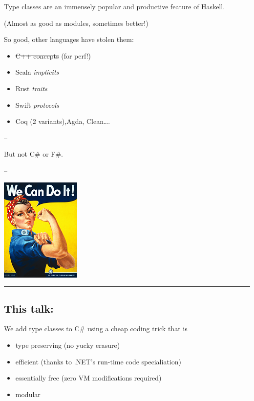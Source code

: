 Type classes are an immensely popular and productive feature of Haskell.

(Almost as good as modules, sometimes better!)

So good, other languages have stolen them:

\begin{itemize}
\tightlist
\item
  \sout{C++ concepts} (for perf!)
\item
  Scala \emph{implicits}
\item
  Rust \emph{traits}
\item
  Swift \emph{protocols}
\item
  Coq (2 variants),Agda, Clean\ldots{}.
\end{itemize}

--

But not C\# or F\#.

--

\includegraphics{./images/wecandoit.png}

\begin{center}\rule{0.5\linewidth}{\linethickness}\end{center}

\subsection{This talk:}\label{this-talk}

We add type classes to C\# using a cheap coding trick that is

\begin{itemize}
\tightlist
\item
  type preserving (no yucky erasure)
\item
  efficient (thanks to .NET's run-time code specialiation)
\item
  essentially free (zero VM modifications required)
\item
  modular
\end{itemize}

